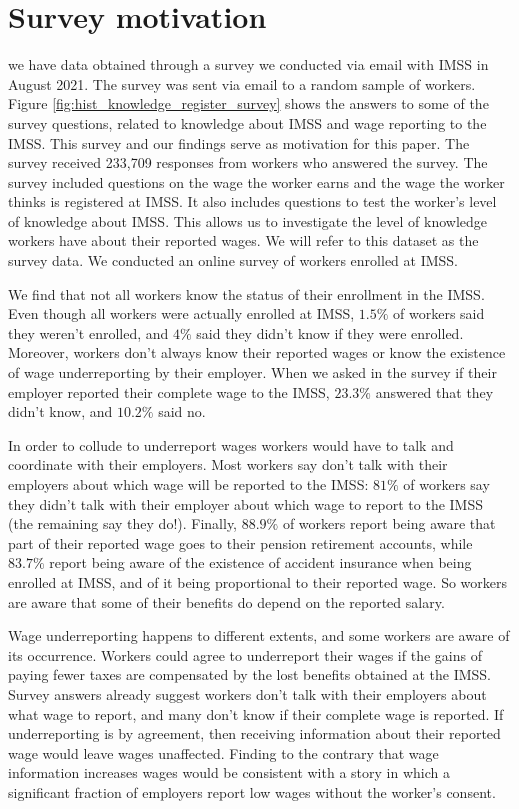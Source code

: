 \documentclass[oneside,11pt]{article}
\begin{document}
\section{Survey motivation}

we have data obtained through a survey we conducted via email with IMSS in August 2021. The survey was sent via email to a random sample of workers. Figure \ref{fig:hist_knowledge_register_survey} shows the answers to some of the survey questions, related to knowledge about IMSS and wage reporting to the IMSS. This survey and our findings serve as motivation for this paper. The survey received 233,709 responses from workers who answered the survey. The survey included questions on the wage the worker earns and the wage the worker thinks is registered at IMSS. It also includes questions to test the worker's level of knowledge about IMSS. This allows us to investigate the level of knowledge workers have about their reported wages. We will refer to this dataset as the survey data. 
We conducted an online survey of workers enrolled at IMSS. 

We find that not all workers know the status of their enrollment in the IMSS. Even though all workers were actually enrolled at IMSS, $1.5\%$ of workers said they weren't enrolled, and $4\%$ said they didn't know if they were enrolled. Moreover, workers don't always know their reported wages or know the existence of wage underreporting by their employer. When we asked in the survey if their employer reported their complete wage to the IMSS, $23.3\%$ answered that they didn't know, and $10.2\%$ said no.

In order to collude to underreport wages workers would have to talk and coordinate with their employers. Most workers say don't talk with their employers about which wage will be reported to the IMSS: $81\%$ of workers say they didn't talk with their employer about which wage to report to the IMSS (the remaining say they do!). Finally,  $88.9\%$ of workers  report being aware that part of their reported wage goes to their pension retirement accounts, while $83.7\%$ report being aware of the existence of accident insurance when being enrolled at IMSS, and of it being proportional to their reported wage. So workers are aware that some of their benefits do depend on the reported salary.

Wage underreporting happens to different extents, and some workers are aware of its occurrence. Workers could agree to underreport their wages if the gains of paying fewer taxes are compensated by the lost benefits obtained at the IMSS. Survey answers already suggest  workers don't talk with their employers about what wage to report, and many don't know if their complete wage is reported. If underreporting is by agreement, then receiving information about their reported wage would leave wages unaffected. Finding to the contrary that wage information increases wages would be consistent with a story in which a significant fraction of employers report low wages without the worker's consent. 
\end{document}
